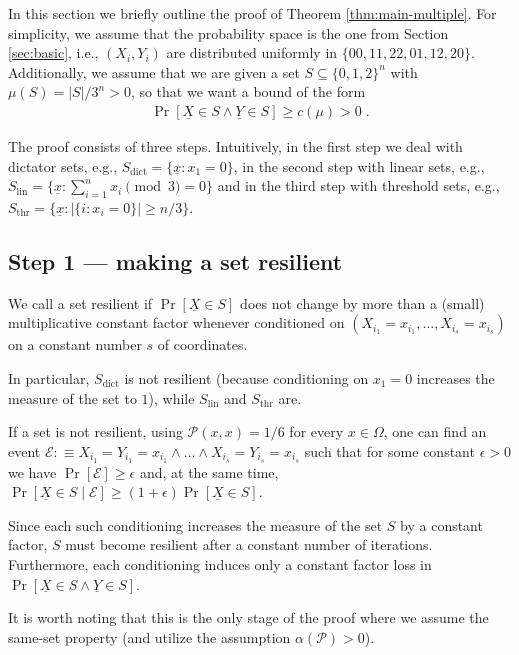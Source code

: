 \documentclass{daj}
\newcommand{\1}{\mathbbm{1}}
\theoremstyle{plain}
\theoremstyle{definition}
\newcommand{\cE}{\mathcal{E}}
\begin{document}
In this section we briefly outline the proof of Theorem \ref{thm:main-multiple}. 
For simplicity, we assume that the probability space is the one from 
Section \ref{sec:basic}, i.e.,
$(X_i, Y_i)$ are distributed uniformly in $\{00, 11, 22, 01, 12, 20\}$.
Additionally, we assume that we are given a set $S \subseteq \{0,1,2\}^n$
with $\mu(S) = |S|/3^n > 0$, so that we want a bound of the form
\begin{align*}
  \Pr\left[ \underline{X} \in S \land \underline{Y} \in S \right] \ge c(\mu) > 0 \; .
\end{align*}

The proof consists of three steps.
Intuitively, in the first step we deal with dictator sets, e.g.,
$S_{\mathrm{dict}} = \{ \underline{x}: x_1 = 0\}$,
in the second step with linear sets, e.g.,
$S_{\mathrm{lin}} = \{ \underline{x}: \sum_{i=1}^n x_i \pmod 3 = 0 \}$
and in the third step with threshold sets, e.g.,
$S_{\mathrm{thr}} = \{ \underline{x}: |\{i: x_i = 0\}| \ge n/3 \}$.

\subsection{Step 1 --- making a set resilient}

We call a set resilient if $\Pr[\underline{X} \in S]$ does not change by more
than a (small) multiplicative constant factor whenever conditioned on 
$(X_{i_1} = x_{i_1}, \ldots, X_{i_s} = x_{i_s})$ on a constant number $s$ of 
coordinates.

In particular, $S_{\mathrm{dict}}$ is not resilient (because
conditioning on $x_1 = 0$ increases the measure of the set to $1$), 
while $S_{\mathrm{lin}}$ and $S_{\mathrm{thr}}$ are.

If a set is not resilient, using $\mathcal{P}(x, x) = 1/6$ for every 
$x \in \Omega$,
one can find an event $\cE :\equiv X_{i_1}=Y_{i_1}=x_{i_1} \land \ldots \land X_{i_s}=Y_{i_s}=x_{i_s}$
such that for some constant $\epsilon > 0$ we have
$\Pr[ \cE ] \ge \epsilon$ and, at the same time,
 $\Pr[\underline{X} \in S \mid \cE] \ge (1+\epsilon)\Pr[\underline{X} \in S]$.

Since each such conditioning increases the measure of the set $S$ by a constant 
factor, $S$ must become resilient after a constant number of iterations.
Furthermore,
each conditioning induces only a constant factor loss in
$\Pr[\underline{X} \in S \land \underline{Y} \in S]$.

It is worth noting that this is the only stage of the proof where
we assume the same-set property (and utilize the assumption
$\alpha(\mathcal{P}) > 0$).
\end{document}
